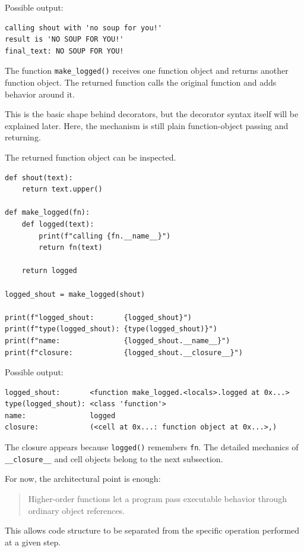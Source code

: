 Possible output:

\begin{verbatim}
calling shout with 'no soup for you!'
result is 'NO SOUP FOR YOU!'
final_text: NO SOUP FOR YOU!
\end{verbatim}

The function \texttt{make\_logged()} receives one function object and returns another function object. The returned function calls the original function and adds behavior around it.

This is the basic shape behind decorators, but the decorator syntax itself will be explained later. Here, the mechanism is still plain function-object passing and returning.

The returned function object can be inspected.

\begin{verbatim}
def shout(text):
    return text.upper()

def make_logged(fn):
    def logged(text):
        print(f"calling {fn.__name__}")
        return fn(text)

    return logged

logged_shout = make_logged(shout)

print(f"logged_shout:       {logged_shout}")
print(f"type(logged_shout): {type(logged_shout)}")
print(f"name:               {logged_shout.__name__}")
print(f"closure:            {logged_shout.__closure__}")
\end{verbatim}

Possible output:

\begin{verbatim}
logged_shout:       <function make_logged.<locals>.logged at 0x...>
type(logged_shout): <class 'function'>
name:               logged
closure:            (<cell at 0x...: function object at 0x...>,)
\end{verbatim}

The closure appears because \texttt{logged()} remembers \texttt{fn}. The detailed mechanics of \texttt{\_\_closure\_\_} and cell objects belong to the next subsection.

For now, the architectural point is enough:

\begin{quote}
Higher-order functions let a program pass executable behavior through ordinary object references.
\end{quote}

This allows code structure to be separated from the specific operation performed at a given step.

